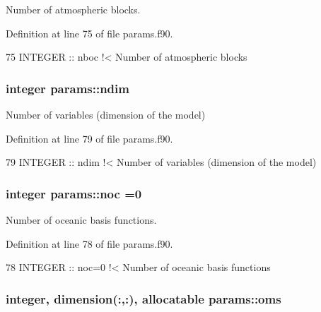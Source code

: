 Number of atmospheric blocks. 



Definition at line 75 of file params.\+f90.


\begin{DoxyCode}
75   \textcolor{keywordtype}{INTEGER} :: nboc\textcolor{comment}{   !< Number of atmospheric blocks}
\end{DoxyCode}
\subsubsection[{\texorpdfstring{ndim}{ndim}}]{\setlength{\rightskip}{0pt plus 5cm}integer params\+::ndim}\hypertarget{namespaceparams_a2323fe1773f086e20c14f266351c482b}{}\label{namespaceparams_a2323fe1773f086e20c14f266351c482b}


Number of variables (dimension of the model) 



Definition at line 79 of file params.\+f90.


\begin{DoxyCode}
79   \textcolor{keywordtype}{INTEGER} :: ndim\textcolor{comment}{   !< Number of variables (dimension of the model)}
\end{DoxyCode}
\subsubsection[{\texorpdfstring{noc}{noc}}]{\setlength{\rightskip}{0pt plus 5cm}integer params\+::noc =0}\hypertarget{namespaceparams_acdb6ef89bcada9ba7b6b6bba575b60f4}{}\label{namespaceparams_acdb6ef89bcada9ba7b6b6bba575b60f4}


Number of oceanic basis functions. 



Definition at line 78 of file params.\+f90.


\begin{DoxyCode}
78   \textcolor{keywordtype}{INTEGER} :: noc=0\textcolor{comment}{  !< Number of oceanic basis functions}
\end{DoxyCode}
\subsubsection[{\texorpdfstring{oms}{oms}}]{\setlength{\rightskip}{0pt plus 5cm}integer, dimension(\+:,\+:), allocatable params\+::oms}\hypertarget{namespaceparams_a5e25e072992d5908eea5308243b7ec63}{}\label{namespaceparams_a5e25e072992d5908eea5308243b7ec63}


